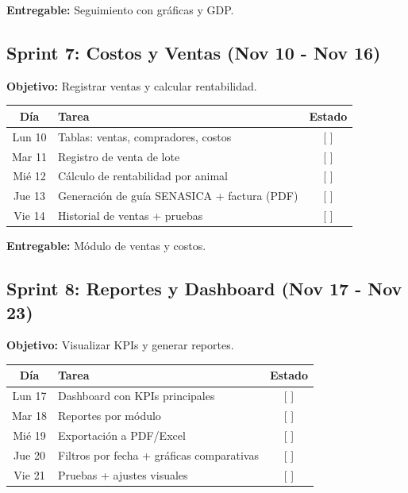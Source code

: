 \documentclass[11pt,a4paper]{article}
\begin{document}
\textbf{Entregable:} Seguimiento con gráficas y GDP.

\vspace{0.5cm}

\subsection*{Sprint 7: Costos y Ventas (Nov 10 - Nov 16)}

\textbf{Objetivo:} Registrar ventas y calcular rentabilidad.

\begin{center}
\begin{tabularx}{\textwidth}{|c|X|c|}
\hline
\rowcolor{verdeclaro}
\textbf{Día} & \textbf{Tarea} & \textbf{Estado} \\
\hline
Lun 10 & Tablas: ventas, compradores, costos & [ ] \\
\hline
Mar 11 & Registro de venta de lote & [ ] \\
\hline
Mié 12 & Cálculo de rentabilidad por animal & [ ] \\
\hline
Jue 13 & Generación de guía SENASICA + factura (PDF) & [ ] \\
\hline
Vie 14 & Historial de ventas + pruebas & [ ] \\
\hline
\end{tabularx}
\end{center}

\textbf{Entregable:} Módulo de ventas y costos.

\vspace{0.5cm}

\subsection*{Sprint 8: Reportes y Dashboard (Nov 17 - Nov 23)}

\textbf{Objetivo:} Visualizar KPIs y generar reportes.

\begin{center}
\begin{tabularx}{\textwidth}{|c|X|c|}
\hline
\rowcolor{verdeclaro}
\textbf{Día} & \textbf{Tarea} & \textbf{Estado} \\
\hline
Lun 17 & Dashboard con KPIs principales & [ ] \\
\hline
Mar 18 & Reportes por módulo & [ ] \\
\hline
Mié 19 & Exportación a PDF/Excel & [ ] \\
\hline
Jue 20 & Filtros por fecha + gráficas comparativas & [ ] \\
\hline
Vie 21 & Pruebas + ajustes visuales & [ ] \\
\hline
\end{tabularx}
\end{center}
\end{document}

